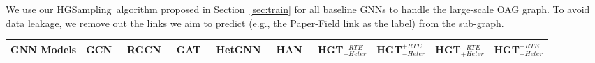 \documentclass[sigconf]{acmart}
\theoremstyle{definition}
\newcommand{\short}{HGT}
\newcommand{\sampling}{HGSampling}
\begin{document}
We use our \sampling\ algorithm proposed in Section~\ref{sec:train} for all baseline GNNs to handle the large-scale OAG graph. To avoid data leakage, we remove out the links we aim to predict (e.g., the Paper-Field link as the label) from the sub-graph.





\begin{table*}[!tp]
\centering
\small
\renewcommand\arraystretch{1.3}
\setlength{\tabcolsep}{3pt}
\begin{tabular}{c|c|c|ccccc|cccc} 
\toprule
\multicolumn{3}{c|}{GNN Models} & GCN~\cite{gcn}  & RGCN~\cite{DBLP:conf/esws/SchlichtkrullKB18}& GAT~\cite{gat}& HetGNN~\cite{DBLP:conf/kdd/ZhangSHSC19} & HAN~\cite{DBLP:conf/www/WangJSWYCY19} &{ \short$_{-Heter}^{-RTE}$} & \short$_{-Heter}^{+RTE}$ & \short$_{+Heter}^{-RTE}$ & \short$_{+Heter}^{+RTE}$ \\ \midrule


\end{tabular}
\end{table*}
\end{document}
